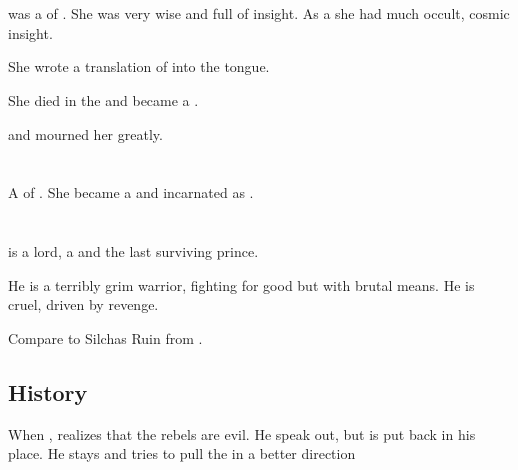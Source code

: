\section{\Essenai}
\index{\Essenai}
\Essenai was a \sathariah \resvil of \Kezerad.
She was very wise and full of insight.
As a \sathariah she had much occult, cosmic insight. 

She wrote a translation of \WanderersInDarknessEmph into the \Resphan tongue.

She died in the  and became a \sephirah.

 and mourned her greatly.


















\section{\Eryal}
\index{\Eryal}
A \thelyad{} \resvil{} of \Kezerad. 
She became a \malach{} and incarnated as . 















\section[Sithiyacan]{\Sithiyacaan}
\index{\Sithiyacaan}
\Sithiyacaan{} is a \resphan{} lord, a \sathariah{} and the last surviving  prince. 

He is a terribly grim warrior, fighting for good but with brutal means. He is cruel, driven by revenge. 

Compare to Silchas Ruin from \cite{StevenErikson:ReapersGale}.









\subsection{History}
When , \Sithiyacaan{} realizes that the rebels are evil. He speak out, but is put back in his place. He stays and tries to pull the  in a better direction

